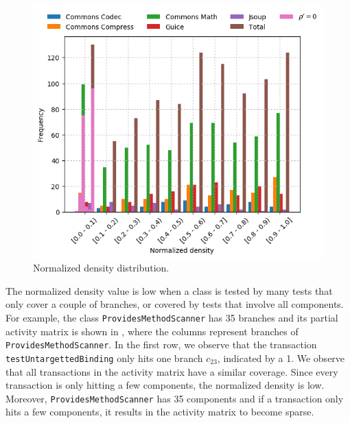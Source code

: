 \documentclass[twoside,a4paper,11pt]{memoir}
\begin{document}
\begin{figure}
    \centering
    \includegraphics[width=\linewidth]{figures/grouped_barchart_density}
    \caption{Normalized density distribution.}%
    \label{fig:hist_normalized_density}
\end{figure}

The normalized density value is low when a class is tested by many tests that only cover a couple of branches, or covered by tests that involve all components.
For example, the class \texttt{ProvidesMethodScanner} has 35 branches and its partial activity matrix is shown in , where the columns represent branches of \texttt{Provides\-Method\-Scanner}.
In the first row, we observe that the transaction \texttt{test\-Untargetted\-Binding} only hits one branch \(c_{23} \), indicated by a 1.
We observe that all transactions in the activity matrix have a similar coverage.
Since every transaction is only hitting a few components, the normalized density is low.
Moreover, \texttt{Provides\-Method\-Scanner} has 35 components and if a transaction only hits a few components, it results in the activity matrix to become sparse.
\end{document}
